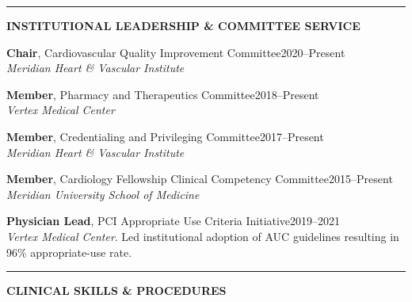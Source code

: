 \documentclass[11pt,a4paper]{article}
\newcommand{\cvsection}[1]{%
  \vspace{1.2em}%
  \noindent
  {\color{primary}\rule{3.5pt}{15pt}}\hspace{8pt}%
  {\color{primary}\Large\bfseries\MakeUppercase{#1}}%
  \vspace{0.2em}%
  \par\noindent{\color{primary!25}\rule{\textwidth}{0.5pt}}%
  \vspace{0.6em}%
}
\begin{document}
\cvsection{Institutional Leadership \& Committee Service}

\vspace{-2pt}
{\color{darktext}
\noindent\textbf{Chair}, Cardiovascular Quality Improvement Committee\hfill 2020--Present\\
\textit{Meridian Heart \& Vascular Institute}

\vspace{2pt}
\noindent\textbf{Member}, Pharmacy and Therapeutics Committee\hfill 2018--Present\\
\textit{Vertex Medical Center}

\vspace{2pt}
\noindent\textbf{Member}, Credentialing and Privileging Committee\hfill 2017--Present\\
\textit{Meridian Heart \& Vascular Institute}

\vspace{2pt}
\noindent\textbf{Member}, Cardiology Fellowship Clinical Competency Committee\hfill 2015--Present\\
\textit{Meridian University School of Medicine}

\vspace{2pt}
\noindent\textbf{Physician Lead}, PCI Appropriate Use Criteria Initiative\hfill 2019--2021\\
\textit{Vertex Medical Center}. Led institutional adoption of AUC guidelines resulting in 96\% appropriate-use rate.
}

\cvsection{Clinical Skills \& Procedures}
\end{document}
